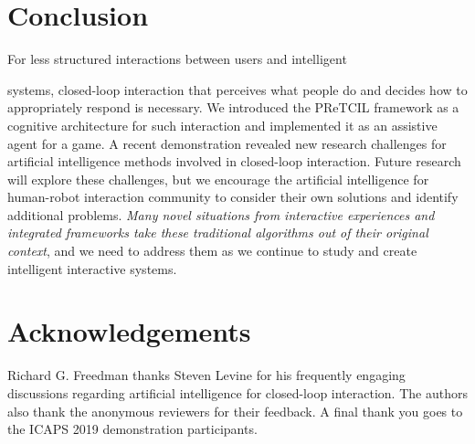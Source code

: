 \documentclass[letterpaper]{article} %
\begin{document}




\section{Conclusion\label{sec:conclusion}}
For less structured interactions between users and intelligent

\noindent systems, closed-loop interaction that perceives what people do and decides how to appropriately respond is necessary.  We introduced the {\sc PReTCIL} framework as a cognitive architecture for such interaction and implemented it as an assistive agent for a game.  A recent demonstration %
 revealed new research challenges for artificial intelligence methods involved in closed-loop interaction. %
 Future research will explore these challenges, but we encourage the artificial intelligence for human-robot interaction community to consider their own solutions and identify additional problems.  \textit{Many novel situations from interactive experiences and integrated frameworks take these traditional algorithms out of their original context}, and we need to address them as we continue to study and create intelligent interactive systems.
 
 \section*{Acknowledgements} Richard G. Freedman thanks Steven Levine for his frequently engaging discussions regarding artificial intelligence for closed-loop interaction.  The authors also thank the anonymous reviewers for their feedback.  A final thank you goes to the ICAPS 2019 demonstration participants. \newpage %



\end{document}
